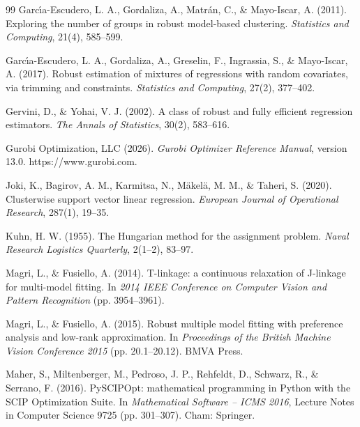 \begin{thebibliography}{99}
 Garc\'{\i}a-Escudero, L. A., Gordaliza, A., Matr\'{a}n, C., \& Mayo-Iscar, A. (2011). Exploring the number of groups in robust model-based clustering. \textit{Statistics and Computing}, 21(4), 585--599.

 Garc\'{\i}a-Escudero, L. A., Gordaliza, A., Greselin, F., Ingrassia, S., \& Mayo-Iscar, A. (2017). Robust estimation of mixtures of regressions with random covariates, via trimming and constraints. \textit{Statistics and Computing}, 27(2), 377--402.

 Gervini, D., \& Yohai, V. J. (2002). A class
of robust and fully efficient regression estimators. \textit{The Annals of Statistics}, 30(2),
583--616.

 Gurobi Optimization, LLC (2026). \textit{Gurobi Optimizer Reference Manual}, version 13.0. https://www.gurobi.com.

 Joki, K., Bagirov, A. M., Karmitsa, N., M\"{a}kel\"{a}, M. M., \& Taheri, S. (2020). Clusterwise support vector linear regression. \textit{European Journal of Operational Research}, 287(1), 19--35.

 Kuhn, H. W. (1955). The Hungarian method for the
assignment problem. \textit{Naval Research Logistics Quarterly}, 2(1--2), 83--97.

 Magri, L., \& Fusiello, A. (2014). T-linkage: a continuous relaxation of J-linkage for multi-model fitting. In \textit{2014 IEEE Conference on Computer Vision and Pattern Recognition} (pp. 3954--3961).

 Magri, L., \& Fusiello, A. (2015). Robust multiple model fitting with preference analysis and low-rank approximation. In \textit{Proceedings of the British Machine Vision Conference 2015} (pp. 20.1--20.12). BMVA Press.

 Maher, S., Miltenberger, M., Pedroso, J. P., Rehfeldt, D., Schwarz, R., \& Serrano, F. (2016). PySCIPOpt: mathematical programming in Python with the SCIP Optimization Suite. In \textit{Mathematical Software -- ICMS 2016}, Lecture Notes in Computer Science 9725 (pp. 301--307). Cham: Springer.


\end{thebibliography}
